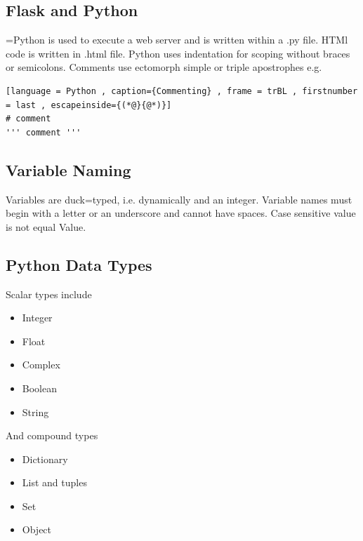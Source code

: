 \documentclass[a4paper]{article}
\theoremstyle{plain}
\theoremstyle{definition}
\theoremstyle{remark}
\begin{document}
\begin{flushleft}
\subsection{Flask and Python}
=Python is used to execute a web server and is written within a .py file. HTMl code is written in .html file. Python uses indentation for scoping without braces or semicolons. Comments use ectomorph simple or triple apostrophes e.g.
\begin{lstlisting}[language = Python , caption={Commenting} , frame = trBL , firstnumber = last , escapeinside={(*@}{@*)}]
# comment
''' comment '''
\end{lstlisting}
\subsection{Variable Naming}
Variables are duck=typed, i.e. dynamically and an integer. Variable names must begin with a letter or an underscore and cannot have spaces. Case sensitive value is not equal Value.
\subsection{Python Data Types}
Scalar types include
\begin{itemize}
	\item Integer
	\item Float
	\item Complex
	\item Boolean
	\item String
\end{itemize}
And compound types
\begin{itemize}
	\item Dictionary
	\item List and tuples
	\item Set
	\item Object
\end{itemize}

\end{flushleft}
\end{document}
